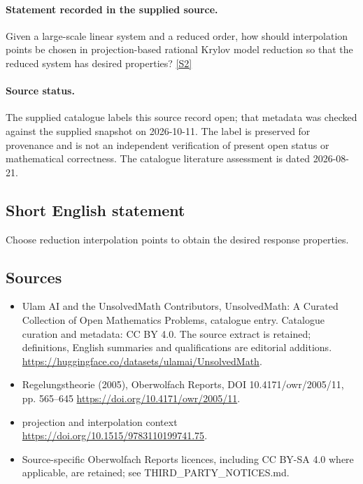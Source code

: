 \documentclass[11pt]{article}
\begin{document}
\paragraph{Statement recorded in the supplied source.}
Given a large-scale linear system and a reduced order, how should interpolation points be chosen in projection-based rational Krylov model reduction so that the reduced system has desired properties? \href{https://doi.org/10.4171/owr/2005/11}{[S2]}
\paragraph{Source status.}
The supplied catalogue labels this source record open; that metadata was checked against the supplied snapshot on 2026-10-11. The label is preserved for provenance and is not an independent verification of present open status or mathematical correctness. The catalogue literature assessment is dated 2026-08-21.
\subsection{Short English statement}
Choose reduction interpolation points to obtain the desired response properties.
\subsection{Sources}
\begin{itemize}
\item[S1] Ulam AI and the UnsolvedMath Contributors, UnsolvedMath: A Curated Collection of Open Mathematics Problems, catalogue entry. Catalogue curation and metadata: CC BY 4.0. The source extract is retained; definitions, English summaries and qualifications are editorial additions.
\url{https://huggingface.co/datasets/ulamai/UnsolvedMath}.
\item[S2] Regelungstheorie (2005), Oberwolfach Reports, DOI 10.4171/owr/2005/11, pp. 565--645
\url{https://doi.org/10.4171/owr/2005/11}.
\item[S3] projection and interpolation context
\url{https://doi.org/10.1515/9783110199741.75}.
\item Source-specific Oberwolfach Reports licences, including CC BY-SA 4.0 where applicable, are retained; see THIRD\_PARTY\_NOTICES.md.
\end{itemize}
\end{document}
